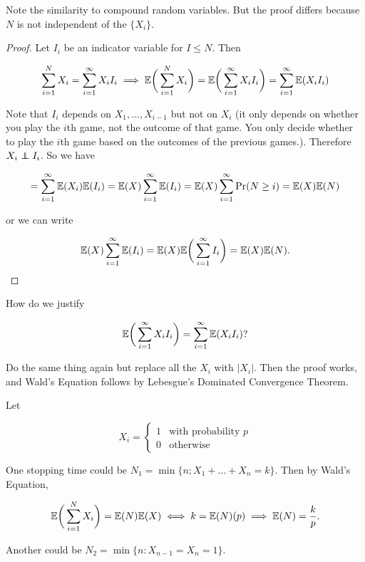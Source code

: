 \begin{remark}Note the similarity to compound random variables. But the proof differs because \(N\) is not independent of the \(\{X_i\}\).

\end{remark}

\begin{proof} Let \(I_i\) be an indicator variable for \(I \leq N\). Then

\[
\sum_{i=1}^N X_i = \sum_{i=1}^\infty X_i I_i \implies \E \bigg( \sum_{i=1}^N X_i \bigg) = \E \bigg(  \sum_{i=1}^\infty X_i I_i \bigg) =  \sum_{i=1}^\infty \E(X_i I_i)
\]

Note that \(I_i\) depends on \(X_1, \ldots, X_{i-1}\) but not on \(X_i\) (it only depends on whether you play the \(i\)th game, not the outcome of that game. You only decide whether to play the \(i\)th game based on the outcomes of the previous games.). Therefore \(X_i \indep I_i\). So we have

\[
=  \sum_{i=1}^\infty \E(X_i) \E( I_i) =   \E(X)  \sum_{i=1}^\infty\E( I_i) =   \E(X)  \sum_{i=1}^\infty\Pr(N \geq i) = \E(X) \E(N)
\]

or we can write

\[
\E(X)  \sum_{i=1}^\infty\E( I_i)  = \E(X) \E \bigg( \sum_{i=1}^\infty I_i \bigg)  = \E(X) \E(N) .
\]

\end{proof}

\begin{remark}How do we justify 

\[
\E \bigg(  \sum_{i=1}^\infty X_i I_i \bigg) =  \sum_{i=1}^\infty \E(X_i I_i)?
\]

Do the same thing again but replace all the \(X_i\) with \(|X_i|\). Then the proof works, and Wald's Equation follows by Lebesgue's Dominated Convergence Theorem.

\end{remark}

\begin{example} Let

\[
X_i = \begin{cases}
1 & \text{with probability } p \\
0 & \text{otherwise}
\end{cases}
\]

One stopping time could be \(N_1 = \min \{n; X_1 + \ldots + X_n = k\}\). Then by Wald's Equation,

\[
\E \bigg( \sum_{i=1}^N X_i \bigg) = \E(N) \E(X) \iff k = \E(N) (p) \implies \E(N) = \frac{k}{p}.
\]

Another could be \(N_2 = \min \{n: X_{n-1} = X_n = 1\}\).

\end{example}

